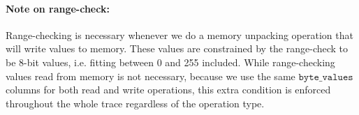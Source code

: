 \paragraph*{Note on range-check:} Range-checking is necessary whenever we do a memory unpacking operation that will
write values to memory. These values are constrained by the range-check to be 8-bit values, i.e. fitting between 0 and 255 included.
While range-checking values read from memory is not necessary, because we use the same $\texttt{byte\_values}$ columns for both read
and write operations, this extra condition is enforced throughout the whole trace regardless of the operation type.

